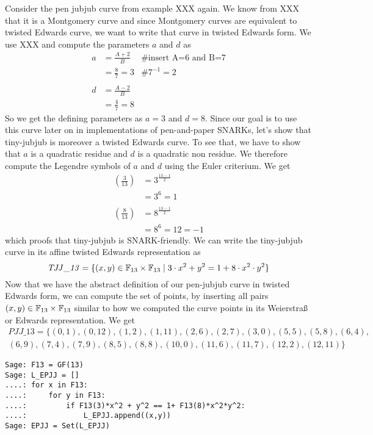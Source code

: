 \begin{example}Consider the pen jubjub curve from example XXX again. We know from XXX that it is a Montgomery curve and since Montgomery curves are equivalent to twisted Edwards curve, we want to write that curve in twisted Edwards form. We use XXX and compute the parameters $a$ and $d$ as
\begin{align*}
a & = \frac{A+2}{B} & \text{\# insert A=6 and B=7}\\
  & = \frac{8}{7} = 3 & \text{\# } 7^{-1}= 2 \\
  \\
d & = \frac{A-2}{B} \\
  & = \frac{4}{7} = 8 
\end{align*}
So we get the defining parameters as $a= 3$ and $d=8$. Since our goal is to use this curve later on in implementations of pen-and-paper SNARKs, let's show that tiny-jubjub is moreover a  twisted Edwards curve. To see that, we  have to show that $a$ is a quadratic residue and $d$ is a quadratic non residue. We therefore compute the Legendre symbols of $a$ and $d$ using the Euler criterium. We get
\begin{align*}
\left(\frac{3}{13}\right) &= 3^{\frac{13-1}{2}} \\
                          & = 3^6 
                            = 1\\
                          \\
\left(\frac{8}{13}\right) &= 8^{\frac{13-1}{2}} \\
                          & = 8^6 
                            = 12
                            = -1                     
\end{align*}
which proofs that tiny-jubjub is SNARK-friendly. We can write the tiny-jubjub curve in its affine twisted Edwards representation as
$$
\mathit{TJJ\_13} = \{(x,y)\in \mathbb{F}_{13}\times \mathbb{F}_{13}\;|\; 3\cdot x^{2} + y^2 =1+ 8\cdot x^{2}\cdot y^2 \}
$$ 
Now that we have the abstract definition of our pen-jubjub curve in twisted Edwards form, we can compute the set of points, by inserting all pairs $(x,y)\in\mathbb{F}_{13}\times \mathbb{F}_{13}$ similar to how we computed the curve points in its Weierstraß or Edwards representation. We get
\begin{multline*}
\mathit{PJJ\_13} = \{(0, 1),(0, 12),(1, 2),(1, 11),(2, 6),(2, 7),(3, 0),(5, 5),(5, 8),(6, 4),\\
(6, 9),(7, 4),(7, 9),(8, 5),(8, 8),(10, 0),(11, 6),(11, 7),(12, 2),(12, 11)\}
\end{multline*}
\begin{verbatim}
Sage: F13 = GF(13)
Sage: L_EPJJ = []
....: for x in F13:
....:     for y in F13:
....:         if F13(3)*x^2 + y^2 == 1+ F13(8)*x^2*y^2:
....:             L_EPJJ.append((x,y))
Sage: EPJJ = Set(L_EPJJ)
\end{verbatim}


\end{example}
